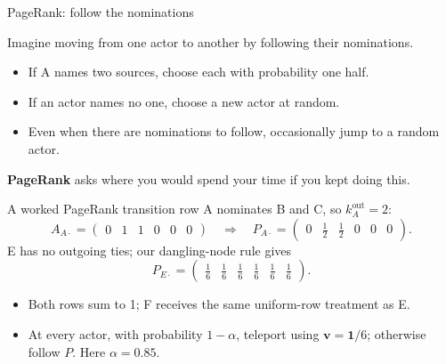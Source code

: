 \documentclass[aspectratio=169,11pt]{beamer}
\newcommand{\ones}{\mathbf{1}}
\begin{document}
\begin{frame}{PageRank: follow the nominations}

Imagine moving from one actor to another by following their nominations.
\begin{itemize}
\item If A names two sources, choose each with probability one half.
\medskip\item If an actor names no one, choose a new actor at random.
\medskip\item Even when there are nominations to follow, occasionally jump to a random actor.
\end{itemize}
\textbf{PageRank} asks where you would spend your time if you kept doing this.

\end{frame}

\begin{frame}{A worked PageRank transition row}
A nominates B and C, so $k_A^{\mathrm{out}}=2$:
\[A_{A\cdot}=\begin{pmatrix}0&1&1&0&0&0\end{pmatrix}
\quad\Longrightarrow\quad
P_{A\cdot}=\begin{pmatrix}0&\tfrac12&\tfrac12&0&0&0\end{pmatrix}.\]
E has no outgoing ties; our dangling-node rule gives
\[P_{E\cdot}=\begin{pmatrix}\tfrac16&\tfrac16&\tfrac16&\tfrac16&\tfrac16&\tfrac16\end{pmatrix}.\]
\begin{itemize}
\item Both rows sum to 1; F receives the same uniform-row treatment as E.
\item At every actor, with probability $1-\alpha$, teleport using $\mathbf{v}=\ones/6$; otherwise follow $P$. Here $\alpha=0.85$.
\end{itemize}
\end{frame}
\end{document}
